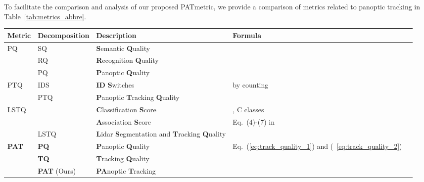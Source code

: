 \documentclass[letterpaper, 10 pt, journal, twoside]{IEEEtran}
\newcommand{\tableref}[1]{Table~\ref{#1}}
\newcommand{\newmet}{PAT}
\begin{document}
To facilitate the comparison and analysis of our proposed \newmet metric, we provide a comparison of metrics related to panoptic tracking in \tableref{tab:metrics_abbre}.

\begin{table*}
\centering
\caption{Panoptic segmentation and tracking metrics, PQ is the panoptic segmentation metric, PTQ, LSTQ, and PAT are the panoptic tracking metrics.}
\label{tab:metrics_abbre}
\footnotesize
\begin{tabular}
{lllll}
\toprule
Metric & Decomposition & Description & Formula \\
\toprule
\multirow{2}{*}{PQ~\cite{kirillov2019panoptic}} & SQ & \textbf{S}emantic \textbf{Q}uality &  \\ & RQ & \textbf{R}ecognition \textbf{Q}uality &  \\ & PQ & \textbf{P}anoptic \textbf{Q}uality  &  \\
\midrule
\multirow{2}{*}{PTQ~\cite{hurtado2020mopt}}
& IDS & \textbf{ID} \textbf{S}witches  & by counting \\
& PTQ & \textbf{P}anoptic \textbf{T}racking \textbf{Q}uality &  \\
\midrule
\multirow{3}{*}{LSTQ~\cite{aygun20214d}}
&  & \textbf{C}lassification \textbf{S}core  &  , C classes \\
&  & \textbf{A}ssociation \textbf{S}core & Eq.~(4)-(7) in \cite{aygun20214d}    \\
& LSTQ & \textbf{L}idar \textbf{S}egmentation and \textbf{T}racking \textbf{Q}uality &     \\
\midrule
\multirow{3}{*}{\textbf{PAT}} & \textbf{PQ} & \textbf{P}anoptic \textbf{Q}uality & Eq.~(\ref{eq:track_quality_1}) and (~\ref{eq:track_quality_2})\\
& \textbf{TQ} & \textbf{T}racking \textbf{Q}uality &  \\
& \textbf{PAT} (Ours) & \textbf{PA}noptic \textbf{T}racking &  \\
\bottomrule
\end{tabular}
\end{table*}
\end{document}
